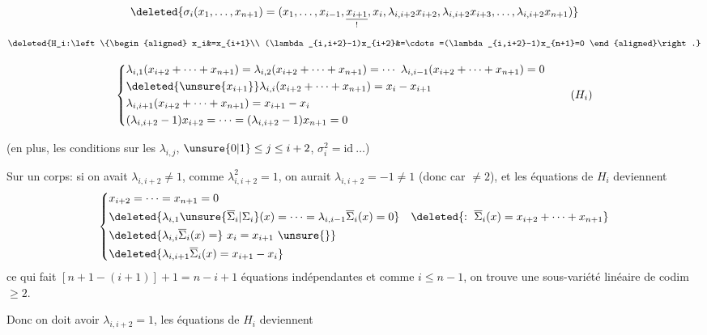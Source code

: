 \[
\deleted{\sigma_i(x_1,\ldots,x_{n+1})=(x_1,\ldots,x_{i-1},\underset{!}{\underline{x_{i+1}}},x_i,\lambda_{i,i+2}x_{i+2},\lambda_{i,i+2}x_{i+3},\ldots,\lambda_{i,i+2}x_{n+1})}
\]
\[
\deleted{H_i:\left\{\begin{aligned}
x_i&=x_{i+1}\\
(\lambda_{i,i+2}-1)x_{i+2}&=\cdots=(\lambda_{i,i+2}-1)x_{n+1}=0
\end{aligned}\right.}
\]

\[
\left\{\begin{aligned}
&\lambda_{i,1}(x_{i+2}+\cdots+x_{n+1})=\lambda_{i,2}(x_{i+2}+\cdots+x_{n+1})=\cdots\ \lambda_{i,i-1}(x_{i+2}+\cdots+x_{n+1})=0\\
&\deleted{\unsure{x_{i+1}}}\lambda_{i,i}(x_{i+2}+\cdots+x_{n+1})=x_i-x_{i+1}\\
&\lambda_{i,i+1}(x_{i+2}+\cdots+x_{n+1})=x_{i+1}-x_i\\
&(\lambda_{i,i+2}-1)x_{i+2}=\cdots=(\lambda_{i,i+2}-1)x_{n+1}=0
\end{aligned}\right.\tag*{$(H_i)$}
\]

(en plus, les conditions sur les $\lambda_{i,j}$, $\unsure{0|1}\leq j\leq i+2$,   $\sigma_i^2=\mathrm{id}\ \ldots$)

 Sur un corps: si on avait $\lambda_{i,i+2}\ne1$, comme $\lambda_{i,i+2}^2=1$, on aurait $\lambda_{i,i+2}=-1\ne1$ (donc car $\ne2$), et les équations de $H_i$ deviennent
\[
\left\{\begin{aligned}
&x_{i+2}=\cdots=x_{n+1}=0\\
&\deleted{\lambda_{i,1}\unsure{\overline{\Sigma}_i|\Sigma_i}(x)=\cdots=\lambda_{i,i-1}\overline{\Sigma}_i(x)=0}\quad\deleted{:\ \overline{\Sigma}_i(x)=x_{i+2}+\cdots+x_{n+1}}\\
&\deleted{\lambda_{i,i}\overline{\Sigma}_i(x)=}\ x_i=x_{i+1}\ \unsure{\}}\\
&\deleted{\lambda_{i,i+1}\overline{\Sigma}_i(x)=x_{i+1}-x_i}
\end{aligned}\right.
\]
ce qui fait $[n+1-(i+1)]+1=n-i+1$ équations  indépendantes et comme $i\leq n-1$, on trouve une sous-variété linéaire de codim $\geq2$.

Donc on doit avoir $\lambda_{i,i+2}=1$, les équations de $H_i$ deviennent
